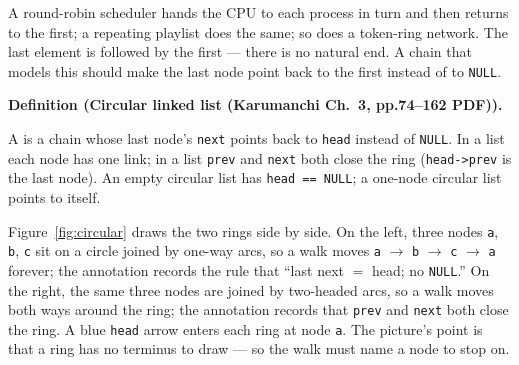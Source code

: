 \documentclass[11pt]{article}
\newenvironment{definitionbox}[1]{%
  \par\noindent\textbf{Definition (#1).}\ \itshape
}{\par\vspace{0.3em}}
\begin{document}
A round-robin scheduler hands the CPU to each process in turn and then returns to the first; a repeating playlist does the same; so does a token-ring network. The last element is followed by the first --- there is no natural end. A chain that models this should make the last node point back to the first instead of to \texttt{NULL}.

\begin{definitionbox}{Circular linked list (Karumanchi Ch.~3, pp.74--162 PDF)}
A  is a chain whose last node's \texttt{next} points back to \texttt{head} instead of \texttt{NULL}. In a  list each node has one link; in a  list \texttt{prev} and \texttt{next} both close the ring (\texttt{head->prev} is the last node). An empty circular list has \texttt{head == NULL}; a one-node circular list points to itself. \cite{Karumanchi2017_data_structures_algorithms_made_easy}
\end{definitionbox}

Figure~\ref{fig:circular} draws the two rings side by side. On the left, three nodes \texttt{a}, \texttt{b}, \texttt{c} sit on a circle joined by one-way arcs, so a walk moves \texttt{a} $\to$ \texttt{b} $\to$ \texttt{c} $\to$ \texttt{a} forever; the annotation records the rule that ``last next $=$ head; no \texttt{NULL}.'' On the right, the same three nodes are joined by two-headed arcs, so a walk moves both ways around the ring; the annotation records that \texttt{prev} and \texttt{next} both close the ring. A blue \texttt{head} arrow enters each ring at node \texttt{a}. The picture's point is that a ring has no terminus to draw --- so the walk must name a node to stop on.
\end{document}

